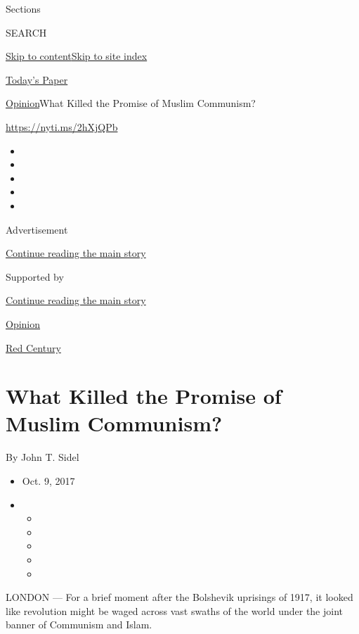 Sections

SEARCH

\protect\hyperlink{site-content}{Skip to
content}\protect\hyperlink{site-index}{Skip to site index}

\href{https://myaccount.nytimes3xbfgragh.onion/auth/login?response_type=cookie\&client_id=vi}{}

\href{https://www.nytimes3xbfgragh.onion/section/todayspaper}{Today's
Paper}

\href{/section/opinion}{Opinion}\textbar{}What Killed the Promise of
Muslim Communism?

\url{https://nyti.ms/2hXjQPb}

\begin{itemize}
\item
\item
\item
\item
\item
\end{itemize}

Advertisement

\protect\hyperlink{after-top}{Continue reading the main story}

Supported by

\protect\hyperlink{after-sponsor}{Continue reading the main story}

\href{/section/opinion}{Opinion}

\href{/column/red-century}{Red Century}

\hypertarget{what-killed-the-promise-of-muslim-communism}{%
\section{What Killed the Promise of Muslim
Communism?}\label{what-killed-the-promise-of-muslim-communism}}

By John T. Sidel

\begin{itemize}
\item
  Oct. 9, 2017
\item
  \begin{itemize}
  \item
  \item
  \item
  \item
  \item
  \end{itemize}
\end{itemize}

LONDON --- For a brief moment after the Bolshevik uprisings of 1917, it
looked like revolution might be waged across vast swaths of the world
under the joint banner of Communism and Islam.

